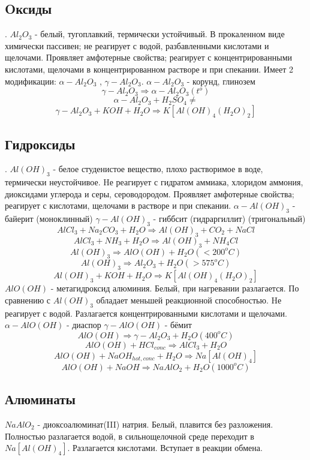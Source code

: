 \documentclass[11pt]{article}
\begin{document}
\subsection{Oксиды}.
$Al _2 O _3$ - белый, тугоплавкий, термически устойчивый. В прокаленном виде химически
пассивен; не реагирует с водой, разбавленными кислотами и щелочами. Проявляет
амфотерные свойства; реагирует с концентрированными кислотами, щелочами в
концентрированном растворе и при спекании. Имеет 2 модификации: $\alpha-Al _2 O _3$ , $\gamma-Al _2 O _3$.
$\alpha-Al_2 O _3$ - корунд, глинозем
$$\gamma-Al _2 O _3 \Rightarrow \alpha-Al _2 O _3 (t^o)$$
$$\alpha-Al _2 O _3 + H_2SO_4 \ne$$
$$\gamma-Al _2 O _3 + KOH + H _2 O \Rightarrow K[Al(OH) _4 (H _2 O) _2 ]$$
\subsection{Гидроксиды}.
$Al(OH)_3$ - белое студенистое вещество, плохо растворимое в воде, термически неустойчивое.
Hе реагирует с гидратом аммиака, хлоридом аммония, диоксидами углерода и серы,
сероводородом. Проявляет амфотерные свойства; реагирует с кислотами, щелочами в
растворе и при спекании.
$\alpha-Al(OH) _3$ - байерит (моноклинный)
$\gamma-Al(OH) _3$ - гиббсит (гидраргиллит) (тригональный)
$$AlCl _3 + Na _2 CO _3 + H _2 O \Rightarrow Al(OH) _3 + CO _2 + NaCl$$
$$AlCl _3 + NH _3 + H _2 O \Rightarrow Al(OH) _3 + NH _4 Cl$$
$$Al(OH) _3 \Rightarrow AlO(OH) + H _2 O (< 200^oC)$$
$$Al(OH) _3 \Rightarrow Al _2 O _3 + H _2 O (> 575^oC)$$
$$Al(OH) _3 + KOH + H _2 O \Rightarrow K[Al(OH) _4 (H _2 O) _2 ]$$
$AlO(OH)$ - метагидроксид алюминия. Белый, при нагревании разлагается. По сравнению с
$Al(OH) _3$ обладает меньшей реакционной способностью. Hе реагирует с водой. Разлагается
концентрированными кислотами и щелочами.
$\alpha-AlO(OH)$ - диаспор
$\gamma-AlO(OH)$ - бёмит
$$AlO(OH) \Rightarrow \gamma-Al _2 O _3 + H _2 O (400^oC)$$
$$AlO(OH) + HCl_{conc} \Rightarrow AlCl _3 + H _2 O$$
$$AlO(OH) + NaOH_{hot, conc} + H _2 O \Rightarrow Na[Al(OH) _4 ]$$
$$AlO(OH) + NaOH \Rightarrow NaAlO _2 + H _2 O (1000^oC)$$

\subsection{Алюминаты}

$NaAlO _2$ - диоксоалюминат(III) натрия. Белый, плавится без разложения. Полностью
разлагается водой, в сильнощелочной среде переходит в $Na[Al(OH) _4 ]$. Разлагается
кислотами. Вступает в реакции обмена.
\end{document}

